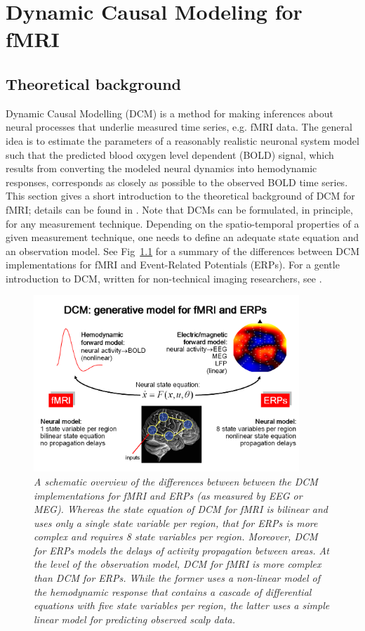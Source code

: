 \chapter{Dynamic Causal Modeling for fMRI \label{Chap:DCM_fmri}}


\section{Theoretical background}
Dynamic Causal Modelling (DCM) is a method for making inferences about neural processes that underlie measured time series, e.g. fMRI data.  The general idea is to estimate the parameters of a reasonably realistic neuronal system model such that the predicted blood oxygen level dependent (BOLD) signal, which results from converting the modeled neural dynamics into hemodynamic responses, corresponds as closely as possible to the observed BOLD time series.  This section gives a short introduction to the theoretical background of DCM for fMRI; details can be found in \cite{dcm}.  Note that DCMs can be formulated, in principle, for any measurement technique.  Depending on the spatio-temporal properties of a given measurement technique, one needs to define an adequate state equation and an observation model. See Fig~\ref{dcm_fig1} for a summary of the differences between DCM implementations for fMRI and Event-Related Potentials (ERPs). For a gentle introduction to DCM, written for non-technical imaging researchers, see \cite{Kahan2013}.

\begin{figure}[ht]
\begin{center}
\includegraphics[width=100mm]{dcm/Fig1}
\caption{\em A schematic overview of the differences between between the DCM implementations for fMRI and ERPs (as measured by EEG or MEG).  Whereas the state equation of DCM for fMRI is bilinear and uses only a single state variable per region, that for ERPs is more complex and requires 8 state variables per region.  Moreover, DCM for ERPs models the delays of activity propagation between areas.  At the level of the observation model, DCM for fMRI is more complex than DCM for ERPs.  While the former uses a non-linear model of the hemodynamic response that contains a cascade of differential equations with five state variables per region, the latter uses a simple linear model for predicting observed scalp data.\label{dcm_fig1}}
\end{center}
\end{figure}


